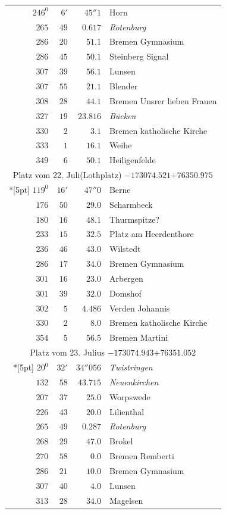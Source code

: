 \clearpage
{}%
\begingroup
\fontsize{10.5}{13}\selectfont
\setlength{\tabcolsep}{3pt}
\setlength{\LTpre}{2pt}
\setlength{\LTpost}{2pt}
\begin{longtable}{@{}rrrp{.61\linewidth}@{}}
\(246^{0}\)&\(6'\)&\(45''1\)&\raggedright Horn\tabularnewline
\(265\)&\(49\)&\(0.617\)&\raggedright \textit{Rotenburg}\tabularnewline
\(286\)&\(20\)&\(51.1\)&\raggedright Bremen Gymnasium\tabularnewline
\(286\)&\(45\)&\(50.1\)&\raggedright Steinberg Signal\tabularnewline
\(307\)&\(39\)&\(56.1\)&\raggedright Lunsen\tabularnewline
\(307\)&\(55\)&\(21.1\)&\raggedright Blender\tabularnewline
\(308\)&\(28\)&\(44.1\)&\raggedright Bremen Unsrer lieben Frauen\tabularnewline
\(327\)&\(19\)&\(23.816\)&\raggedright \textit{Bücken}\tabularnewline
\(330\)&\(2\)&\(3.1\)&\raggedright Bremen katholische Kirche\tabularnewline
\(333\)&\(1\)&\(16.1\)&\raggedright Weihe\tabularnewline
\(349\)&\(6\)&\(50.1\)&\raggedright Heiligenfelde\tabularnewline
\multicolumn{4}{c}{Platz vom 22. Juli(Lothplatz) \(-173074.521\)\qquad\(+76350.975\)}\\*[5pt]
\(119^{0}\)&\(16'\)&\(47''0\)&\raggedright Berne\tabularnewline
\(176\)&\(50\)&\(29.0\)&\raggedright Scharmbeck\tabularnewline
\(180\)&\(16\)&\(48.1\)&\raggedright Thurmspitze?\tabularnewline
\(233\)&\(15\)&\(32.5\)&\raggedright Platz am Heerdenthore\tabularnewline
\(236\)&\(46\)&\(43.0\)&\raggedright Wilstedt\tabularnewline
\(286\)&\(17\)&\(34.0\)&\raggedright Bremen Gymnasium\tabularnewline
\(301\)&\(16\)&\(23.0\)&\raggedright Arbergen\tabularnewline
\(301\)&\(39\)&\(32.0\)&\raggedright Domshof\tabularnewline
\(302\)&\(5\)&\(4.486\)&\raggedright Verden Johannis\tabularnewline
\(330\)&\(2\)&\(8.0\)&\raggedright Bremen katholische Kirche\tabularnewline
\(354\)&\(5\)&\(56.5\)&\raggedright Bremen Martini\tabularnewline
\multicolumn{4}{c}{Platz vom 23. Julius \(-173074.943\)\qquad\(+76351.052\)}\\*[5pt]
\(20^{0}\)&\(32'\)&\(34''056\)&\raggedright \textit{Twistringen}\tabularnewline
\(132\)&\(58\)&\(43.715\)&\raggedright \textit{Neuenkirchen}\tabularnewline
\(207\)&\(37\)&\(25.0\)&\raggedright Worpswede\tabularnewline
\(226\)&\(43\)&\(20.0\)&\raggedright Lilienthal\tabularnewline
\(265\)&\(49\)&\(0.287\)&\raggedright \textit{Rotenburg}\tabularnewline
\(268\)&\(29\)&\(47.0\)&\raggedright Brokel\tabularnewline
\(270\)&\(58\)&\(0.0\)&\raggedright Bremen Remberti\tabularnewline
\(286\)&\(21\)&\(10.0\)&\raggedright Bremen Gymnasium\tabularnewline
\(307\)&\(40\)&\(4.0\)&\raggedright Lunsen\tabularnewline
\(313\)&\(28\)&\(34.0\)&\raggedright Magelsen\tabularnewline

\end{longtable}
